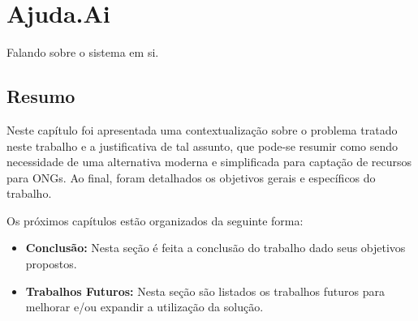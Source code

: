 \chapter{Ajuda.Ai}

Falando sobre o sistema em si.





\section*{Resumo}
Neste capítulo foi apresentada uma contextualização sobre o problema tratado neste trabalho e a justificativa de tal assunto, que pode-se resumir como sendo necessidade de uma alternativa moderna e simplificada para captação de recursos para ONGs. Ao final, foram detalhados os objetivos gerais e específicos do trabalho.

Os próximos capítulos estão organizados da seguinte forma:

\begin{itemize}
  \item \textbf{Conclusão:} Nesta seção é feita a conclusão do trabalho dado seus objetivos propostos.
  \item \textbf{Trabalhos Futuros:} Nesta seção são listados os trabalhos futuros para melhorar e/ou expandir a utilização da solução.
\end{itemize}